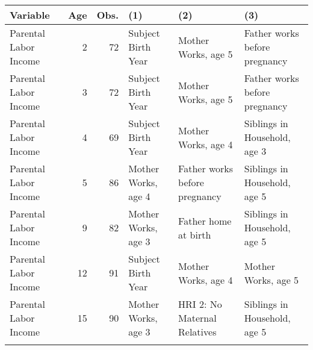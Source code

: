 \tiny
\begin{tabular}{l r r l l l}
\toprule											
Variable	&	Age	&	Obs.	&	(1)	&	(2)	&	(3)	\\
\midrule											
Parental Labor Income	&	2	&	72	&	Subject Birth Year	&	Mother Works, age 5	&	Father works before pregnancy	\\
Parental Labor Income	&	3	&	72	&	Subject Birth Year	&	Mother Works, age 5	&	Father works before pregnancy	\\
Parental Labor Income	&	4	&	69	&	Subject Birth Year	&	Mother Works, age 4	&	Siblings in Household, age 3	\\
Parental Labor Income	&	5	&	86	&	Mother Works, age 4	&	Father works before pregnancy	&	Siblings in Household, age 5	\\
Parental Labor Income	&	9	&	82	&	Mother Works, age 3	&	Father home at birth	&	Siblings in Household, age 5	\\
Parental Labor Income	&	12	&	91	&	Subject Birth Year	&	Mother Works, age 4	&	Mother Works, age 5	\\
Parental Labor Income	&	15	&	90	&	Mother Works, age 3	&	HRI 2: No Maternal Relatives	&	Siblings in Household, age 5	\\
\\


\end{tabular}

